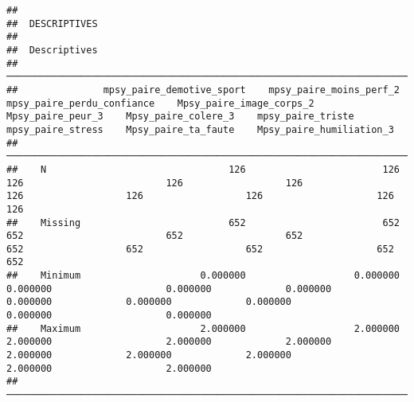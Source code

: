 \documentclass[
]{article}
\begin{document}
\begin{verbatim}
## 
##  DESCRIPTIVES
## 
##  Descriptives                                                                                                                                                                                                                                                           
##  ────────────────────────────────────────────────────────────────────────────────────────────────────────────────────────────────────────────────────────────────────────────────────────────────────────────────────────────────────────────────────────────────────── 
##               mpsy_paire_demotive_sport    mpsy_paire_moins_perf_2    mpsy_paire_perdu_confiance    Mpsy_paire_image_corps_2    Mpsy_paire_peur_3    Mpsy_paire_colere_3    mpsy_paire_triste    mpsy_paire_stress    Mpsy_paire_ta_faute    Mpsy_paire_humiliation_3   
##  ────────────────────────────────────────────────────────────────────────────────────────────────────────────────────────────────────────────────────────────────────────────────────────────────────────────────────────────────────────────────────────────────────── 
##    N                                126                        126                           126                         126                  126                    126                  126                  126                    126                         126   
##    Missing                          652                        652                           652                         652                  652                    652                  652                  652                    652                         652   
##    Minimum                     0.000000                   0.000000                      0.000000                    0.000000             0.000000               0.000000             0.000000             0.000000               0.000000                    0.000000   
##    Maximum                     2.000000                   2.000000                      2.000000                    2.000000             2.000000               2.000000             2.000000             2.000000               2.000000                    2.000000   
##  ──────────────────────────────────────────────────────────────────────────────────────────────────────────────────────────────────────────────────────────────────────────────────────────────────────────────────────────────────────────────────────────────────────
\end{verbatim}
\end{document}

